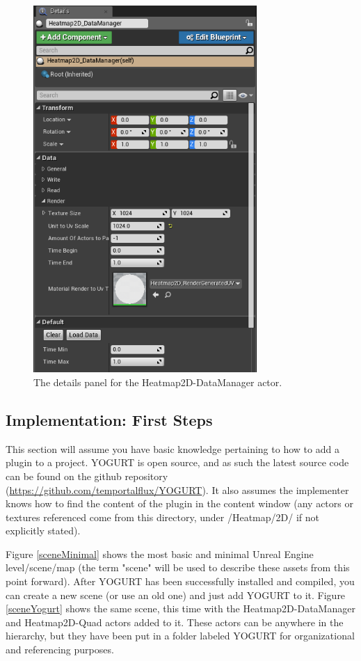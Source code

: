 \documentclass[journal]{IEEEtran}
\begin{document}
\begin{figure}[ht]
\includegraphics[width=8.5cm]{"scene_manager_details"}
\caption{The details panel for the Heatmap2D-DataManager actor.}
\label{sceneManagerDetails}
\end{figure}

\subsection{Implementation: First Steps}

This section will assume you have basic knowledge pertaining to how to add a plugin to a project. YOGURT is open source, and as such the latest source code can be found on the github repository (\url{https://github.com/temportalflux/YOGURT}). It also assumes the implementer knows how to find the content of the plugin in the content window (any actors or textures referenced come from this directory, under /Heatmap/2D/ if not explicitly stated).

Figure \ref{sceneMinimal} shows the most basic and minimal Unreal Engine level/scene/map (the term "scene" will be used to describe these assets from this point forward). After YOGURT has been successfully installed and compiled, you can create a new scene (or use an old one) and just add YOGURT to it. Figure \ref{sceneYogurt} shows the same scene, this time with the Heatmap2D-DataManager and Heatmap2D-Quad actors added to it. These actors can be anywhere in the hierarchy, but they have been put in a folder labeled YOGURT for organizational and referencing purposes.
\end{document}

